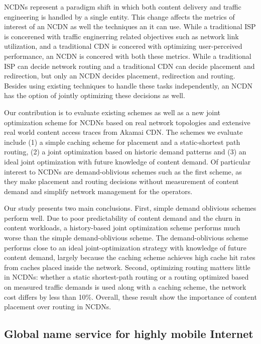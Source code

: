 NCDNs represent a paradigm shift in which both content delivery and traffic engineering is handled by a single entity. This change affects the metrics of interest of an NCDN as well the techniques an it can use. While a traditional ISP is concerened with traffic enginerring related objectives such as network link utilization, and a traditional CDN is concered with optimizing user-perceived performance, an NCDN is concered with both these metrics. While a traditional ISP can decide network routing and a traditional CDN can decide placement and redirection, but only an NCDN decides placement, redirection and routing. Besides using existing techniques to handle these tasks independently, an NCDN has the option of jointly optimizing these decisions as well. 


Our contribution is to evaluate existing schemes as well as a new joint optimization scheme for NCDNs based on real network topologies and extensive real world content access traces from Akamai CDN. The schemes we evaluate include (1) a simple caching scheme for placement and a static-shortest path routing, (2) a joint optimization based on historic demand patterns and (3) an ideal joint optimization with future knowledge of content demand. Of particular interest to NCDNs are demand-oblivious schemes such as the first scheme, as they make placement and routing decisions without measurement of content demand and simplify network management for the operators.


Our study presents two main conclusions. First, simple demand oblivious schemes perform well. Due to poor predictability of content demand and the churn in content workloads, a history-based joint optimization scheme performs much worse than the simple demand-oblivious scheme. The demand-oblivious scheme performs close to an ideal joint-optimization strategy with knowledge of future content demand, largely because the caching scheme achieves high cache hit rates from caches placed inside the network. Second, optimizing routing matters little in NCDNs: whether a static shortest-path routing or a routing optimized based on measured traffic demands is used along with a caching scheme, the network cost differs by less than 10\%.  Overall, these result show the importance of content placement over routing in NCDNs. 



\subsection{Global name service for highly mobile Internet}
\label{sec:intro-gns}


